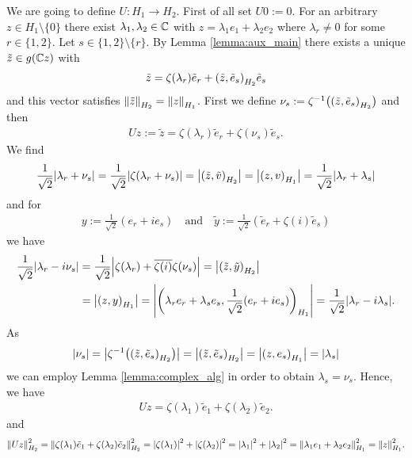 \begin{example}
	We are going to define $U:H_1 \to H_2$. First of all set $U0 := 0$. For an arbitrary $z \in H_1 \setminus \{0\}$ there exist $\lambda_1, \lambda_2 \in \C$ with $z = \lambda_1 e_1 + \lambda_2 e_2$ where $\lambda_r \neq 0$ for some $r \in \{1,2\}$. Let $s \in \{1, 2\} \setminus \{r\}$. By Lemma \ref{lemma:aux_main} there exists a unique $\tilde{z} \in g(\C z)$ with 
	\begin{align*}
		\tilde{z} = \zeta(\lambda_r) \tilde{e}_r + \pbraces{\tilde{z}, \tilde{e}_s}_{H_2} \tilde{e}_s
	\end{align*}
	and this vector satisfies $\norm[H_2]{\tilde{z}} = \norm[H_1]{z}$. First we define $\nu_s := \zeta^{-1}\pbraces{\pbraces{\tilde{z}, \tilde{e}_s}_{H_2}}$ and then
	\begin{align*}
		Uz := \tilde{z} = \zeta(\lambda_r) \tilde{e}_r + \zeta(\nu_s) \tilde{e}_s.
	\end{align*}
	We find 
	\begin{align*}
		\frac{1}{\sqrt{2}} \vbraces{\lambda_r + \nu_s} = \frac{1}{\sqrt{2}} \vbraces{\zeta(\lambda_r + \nu_s)}= \vbraces{\pbraces{\tilde{z}, \tilde{v}}_{H_2}} = \vbraces{\pbraces{z, v}_{H_1}} = \frac{1}{\sqrt{2}} \vbraces{\lambda_r + \lambda_s}
	\end{align*}
	and for
	\begin{align*}
		y := \frac{1}{\sqrt{2}}(e_r + ie_s) \quad \text{and} \quad \tilde{y} := \frac{1}{\sqrt{2}} (\tilde{e}_r + \zeta(i) \tilde{e}_s)
	\end{align*} 
	we have
	\begin{align*}
		\frac{1}{\sqrt{2}}\vbraces{\lambda_r - i\nu_s} &= \frac{1}{\sqrt{2}} \vbraces{\zeta(\lambda_r) + \overline{\zeta(i)} \zeta(\nu_s)}= \vbraces{\pbraces{\tilde{z}, \tilde{y}}_{H_2}} \\
		&= \vbraces{\pbraces{z, y}_{H_1}} = \vbraces{\pbraces{\lambda_r e_r + \lambda_s e_s, \frac{1}{\sqrt{2}}(e_r + ie_s)}_{H_1}} = \frac{1}{\sqrt{2}} \vbraces{\lambda_r - i\lambda_s}.
	\end{align*}
	As
	\begin{align*}
		\vbraces{\nu_s} = \vbraces{\zeta^{-1}\pbraces{\pbraces{\tilde{z}, \tilde{e}_s}_{H_2}}} = \vbraces{\pbraces{\tilde{z}, \tilde{e}_s}_{H_2}} = \vbraces{\pbraces{z, e_s}_{H_1}} = \vbraces{\lambda_s}
	\end{align*} 
	we can employ Lemma \ref{lemma:complex_alg} in order to obtain $\lambda_s = \nu_s$. Hence, we have
	\begin{align*}
		Uz = \zeta(\lambda_1) \tilde{e}_1 + \zeta(\lambda_2) \tilde{e}_2.
	\end{align*}
	and
	\begin{align*}
		\norm[H_2]{Uz}^2 = \norm[H_2]{\zeta\pbraces{\lambda_1} \tilde{e}_1 + \zeta\pbraces{\lambda_2} \tilde{e}_2}^2 = \vbraces{\zeta\pbraces{\lambda_1}}^2 + \vbraces{\zeta\pbraces{\lambda_2}}^2 = \vbraces{\lambda_1}^2 + \vbraces{\lambda_2}^2 = \norm[H_1]{\lambda_1 e_1 + \lambda_2 e_2}^2 = \norm[H_1]{z}^2.
	\end{align*}
\end{example}



